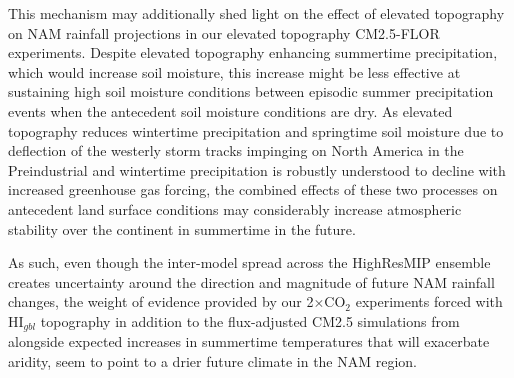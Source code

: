 \documentclass[draft]{agujournal2019}
\begin{document}
This mechanism may additionally shed light on the effect of elevated topography on NAM rainfall projections in our elevated topography CM2.5-FLOR experiments. Despite elevated topography enhancing summertime precipitation, which would increase soil moisture, this increase might be less effective at sustaining high soil moisture conditions between episodic summer precipitation events when the antecedent soil moisture conditions are dry. As elevated topography reduces wintertime precipitation and springtime soil moisture due to deflection of the westerly storm tracks impinging on North America \cite{sextion26jc} in the Preindustrial and wintertime precipitation is robustly understood to decline with increased greenhouse gas forcing, the combined effects of these two processes on antecedent land surface conditions may considerably increase atmospheric stability over the continent in summertime in the future. 

As such, even though the inter-model spread across the HighResMIP ensemble creates uncertainty around the direction and magnitude of future NAM rainfall changes, the weight of evidence provided by our 2$\times$CO$_2$ experiments forced with HI$_{gbl}$ topography in addition to the flux-adjusted CM2.5 simulations from  alongside expected increases in summertime temperatures that will exacerbate aridity, seem to point to a drier future climate in the NAM region.

\end{document}
